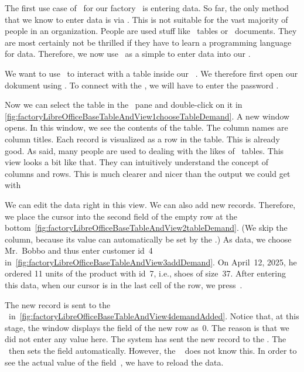 %
The first use case of \libreofficeBase\ for our factory \db\ is entering data.
So far, the only method that we know to enter data is via \sql.
This is not suitable for the vast majority of people in an organization.
People are used stuff like \microsoftExcel\ tables or \microsoftWord\ documents.
They are most certainly not be thrilled if they have to learn a programming language for data.
Therefore, we now use \libreofficeBase\ as a simple  to enter data into our \db.

We want to use \libreofficeBase\ to interact with a table inside our \postgresql\ \db.
We therefore first open our dokument  using \libreofficeBase.
To connect with the \db, we will have to enter the password .

Now we can select the table  in the ~pane and double-click on it in \cref{fig:factoryLibreOfficeBaseTableAndView1chooseTableDemand}.
A new window opens.
In this window, we see the contents of the table.
The column names are column titles.
Each record is visualized as a row in the table.
This is already good.
As said, many people are used to dealing with the likes of \microsoftExcel\ tables.
This view looks a bit like that.
They can intuitively understand the concept of columns and rows.
This is much clearer and nicer than the output we could get with \psql{\dots}%

We can edit the data right in this view.
We can also add new records.
Therefore, we place the cursor into the second field of the empty row at the bottom~\cref{fig:factoryLibreOfficeBaseTableAndView2tableDemand}.
(We skip the  column, because its value can automatically be set by the \dbms.)
As data, we choose Mr.~Bobbo and thus enter customer id~4 in~\cref{fig:factoryLibreOfficeBaseTableAndView3addDemand}.
On April~12, 2025, he ordered 11 units of the product with id~7, i.e., shoes of size~37.
After entering this data, when our cursor is in the last cell of the row, we press~\keys{\tab}.

The new record is sent to the \dbms\ in~\cref{fig:factoryLibreOfficeBaseTableAndView4demandAdded}.
Notice that, at this stage, the window displays the  field of the new row as~0.
The reason is that we did not enter any value here.
The system has sent the new record to the \dbms.
The \dbms\ then sets the  field automatically.
However, the \libreofficeBase\  does not know this.
In order to see the actual value of the field~, we have to reload the data.

